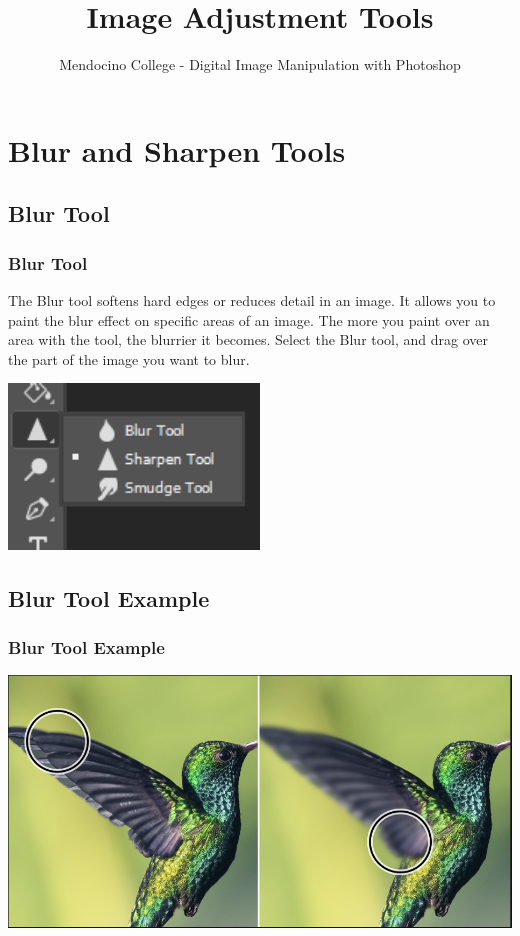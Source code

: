 \documentclass{beamer}
\title{Image Adjustment Tools}
\author{Mendocino College - Digital Image Manipulation with Photoshop}
\date{\vspace{-5em}}
\begin{document}
	{
		\begin{frame}
			\vspace{-35pt}
			\maketitle
		\end{frame}
	}


		\section{Blur and Sharpen Tools}
			\subsection{Blur Tool}		
			\begin{frame}
				\frametitle{Blur Tool}
				\begin{outline}
					\1 The Blur tool softens hard edges or reduces detail in an image.
					\1 It allows you to paint the blur effect on specific areas of an image.
					\1 The more you paint over an area with the tool, the blurrier it becomes.
					\1 Select the Blur tool, and drag over the part of the image you want to blur.
				\end{outline}
							\includegraphics[width=0.5\textwidth]{images/sharpen tool.png}
			\end{frame}
		
					\subsection{Blur Tool Example}		
		\begin{frame}
			\frametitle{Blur Tool Example}
			\includegraphics[width=1.0\textwidth]{images/blur tool.png}
		\end{frame}
\end{document}
